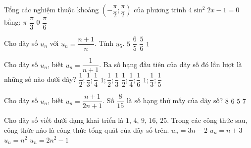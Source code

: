 \begin{ex}%
Tổng các nghiệm thuộc khoảng $\left(-\dfrac{\pi}{2} ; \dfrac{\pi}{2}\right)$ của phương trình $4 \sin^{2} 2 x-1=0$ bằng:
	\choice
	{$\pi$}
	{$\dfrac{\pi}{3}$}
	{\True $0$}
	{$\dfrac{\pi}{6}$}
\end{ex}
\begin{ex}%
	Cho dãy số $u_{n}$ với $u_{n}=\dfrac{n+1}{n}$. Tính $u_{5}$.
	\choice
	{$5$}
	{\True $\dfrac{6}{5}$}
	{$\dfrac{5}{6}$}
	{$1$}
\end{ex}
\begin{ex}%
	Cho dãy số $u_n$, biết $u_n=\dfrac{1}{n+1}$. Ba số hạng đầu tiên của dãy số đó lần lượt là những số nào dưới đây?
	\choice
	{\True $\dfrac{1}{2} ; \dfrac{1}{3} ; \dfrac{1}{4}$}
	{$1 ; \dfrac{1}{2} ; \dfrac{1}{3}$}
	{$\dfrac{1}{2} ; \dfrac{1}{4} ; \dfrac{1}{6}$}
	{$1 ; \dfrac{1}{3} ; \dfrac{1}{5}$}
\end{ex}
\begin{ex}%
	Cho dãy số $u_n$, biết $u_n=\dfrac{n+1}{2n+1}$. Số $\dfrac{8}{15}$ là số hạng thứ mấy của dãy số?
	\choice
	{$8$}
	{$6$}
	{$5$}
	{\True $7$}
\end{ex}
\begin{ex}%
	Cho dãy số viết dưới dạng khai triển là $1$, $4$, $9$, $16$, $25$. Trong các công thức sau, công thức nào là công thức tổng quát của dãy số trên.
	\choice
	{$u_n=3n-2$}
	{$u_n=n+3$}
	{$u_n=n^2$}
	{\True $u_n=2n^2-1$}
\end{ex}
